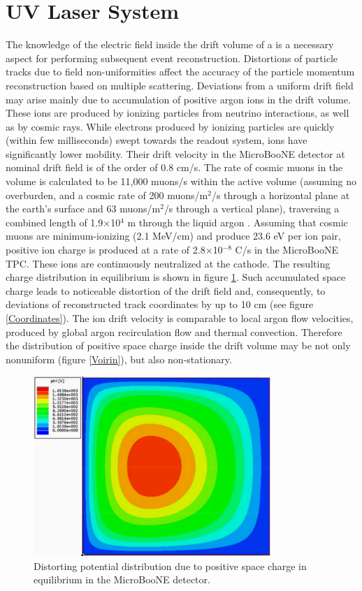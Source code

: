 \section{UV Laser System}
\label{sec:laser}

The knowledge of the electric field inside the drift volume of a \lartpc is a necessary aspect for performing subsequent event reconstruction. Distortions of particle tracks due to field non-uniformities affect the accuracy of the particle momentum reconstruction based on multiple scattering.  Deviations from a uniform drift field may arise mainly due to accumulation of positive argon ions in the drift volume. These ions are produced by ionizing particles from neutrino interactions, as well as by cosmic rays. While electrons produced by ionizing particles are quickly (within few milliseconds) swept towards the readout system, ions have significantly lower mobility. Their drift velocity in the MicroBooNE detector at nominal drift field is of the order of 0.8 cm/s. The rate of cosmic muons in the \lartpc volume is calculated to be 11,000 muons/s within the active volume (assuming no overburden, and a cosmic rate of 200 muons/m$^2$/s through a horizontal plane at the earth's surface and 63 muons/m$^2$/s through a vertical plane), traversing a combined length of 1.9$\times$10$^4$ m through the liquid argon \cite{mcdonald1,mcdonald2}.  Assuming that cosmic muons are minimum-ionizing (2.1 MeV/cm) and produce 23.6 eV per ion pair, positive ion charge is produced at a rate of 2.8$\times$10$^{-8}$ C/s in the MicroBooNE TPC. These ions are continuously neutralized at the cathode. The resulting charge distribution in equilibrium is shown in figure \ref{Ions}. Such accumulated space charge leads to noticeable distortion of the drift field and, consequently, to deviations of reconstructed track coordinates by up to 10 cm (see figure \ref{Coordinates}).  The ion drift velocity is comparable to local argon flow velocities, produced by global argon recirculation flow and thermal convection. Therefore the distribution of positive space charge inside the drift volume may be not only nonuniform (figure \ref{Voirin}), but also non-stationary.

\begin{figure}[htb]
\centering	
\includegraphics[width=0.8\textwidth]{figures/Potential.pdf}
\caption{Distorting potential distribution due to positive space charge in equilibrium in the MicroBooNE detector.}
\label{Ions}
\end{figure}

